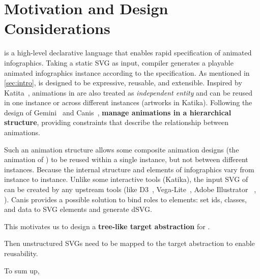 \section{Motivation and Design Considerations}
\label{sec:motivation}


\gaia{} is a high-level declarative language that enables rapid specification of animated infographics.
Taking a static SVG as input, \gaia{} compiler generates a playable animated infographics instance according to the \gaia{} specification.
As mentioned in \autoref{sec:intro}, \gaia{} is designed to be expressive, reusable, and extensible.
Inspired by Katita~\cite{jahanlou2022katika}, animations in \gaia{} are also treated as \textit{independent entity} and can be reused in one instance or across different instances (\ie artworks in Katika).
Following the design of Gemini~\cite{kim2020gemini} and Canis~\cite{ge2020canis}, \gaia{} \textbf{manage animations in a hierarchical structure}, providing constraints that describe the relationship between animations.

Such an animation structure allows some composite animation designs (\eg the animation of ) to be reused within a single instance, but not between different instances.
Because the internal structure and elements of infographics vary from instance to instance.
Unlike some interactive tools (\eg Katika), the input SVG of \gaia{} can be created by any upstream tools (like D3~\cite{bostock2011d3}, Vega-Lite~\cite{satyanarayan2016vega}, Adobe Illustrator ~\cite{AdobeAI}, \etcns).
Canis provides a possible solution to bind roles to elements: set ids, classes, and data to SVG elements and generate dSVG.

This motivates us to design a \textbf{tree-like target abstraction} for \gaia{}.


Then unstructured SVGs need to be mapped to the target abstraction to enable reusability.

To sum up, 
